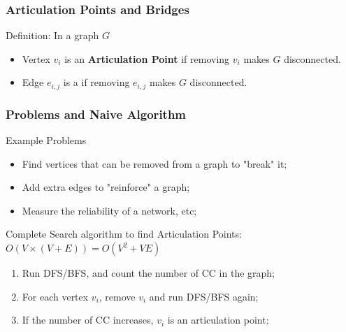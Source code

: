 \begin{frame}
  \frametitle{Articulation Points and Bridges}
    \begin{block}{Definition: In a graph $G$}
      \begin{itemize}
      \item Vertex $v_i$ is an {\bf Articulation Point} if removing $v_i$ makes $G$ disconnected.
      \item Edge $e_{i,j}$ is a  if removing $e_{i,j}$ makes $G$ disconnected.
      \end{itemize}
    \end{block}
    \begin{center}
      \end{center}
\end{frame}

\begin{frame}
  \frametitle{Problems and Naive Algorithm}
  \begin{exampleblock}{Example Problems}
    \begin{itemize}
      \item Find vertices that can be removed from a graph to "break" it;
      \item Add extra edges to "reinforce" a graph;
      \item Measure the reliability of a network, etc;
    \end{itemize}
  \end{exampleblock}\medskip

  \begin{block}{Complete Search algorithm to find Articulation Points: $O(V\times(V+E)) = O(V^2+VE)$}
  \begin{enumerate}
    \item Run DFS/BFS, and count the number of CC in the graph;
    \item For each vertex $v_i$, remove $v_i$ and run DFS/BFS again;
    \item If the number of CC increases, $v_i$ is an articulation point;
  \end{enumerate}
  \end{block}
\end{frame}

